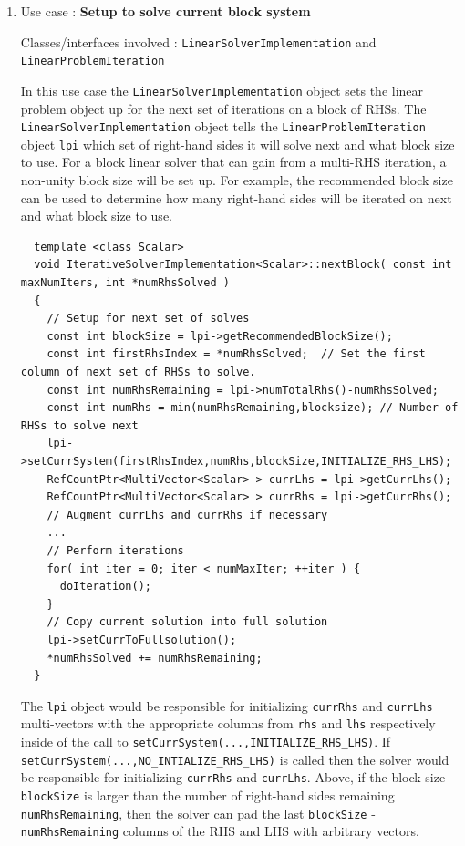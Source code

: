 \documentclass[pdf,ps2pdf,11pt]{SANDreport}
\begin{document}
\begin{enumerate}

{}\item Use case : \textbf{Setup to solve current block system}

{}\noindent{}Classes/interfaces involved :
{}\texttt{Linear\-Solver\-Implementation} and
{}\texttt{Linear\-Problem\-Iteration}

In this use case the {}\texttt{Linear\-Solver\-Implementation} object
sets the linear problem object up for the next set of iterations on a
block of RHSs.  The {}\texttt{Linear\-Solver\-Implementation} object
tells the {}\texttt{Linear\-Problem\-Iteration} object {}\texttt{lpi}
which set of right-hand sides it will solve next and what block size
to use.  For a block linear solver that can gain from a multi-RHS
iteration, a non-unity block size will be set up.  For example, the
recommended block size can be used to determine how many right-hand
sides will be iterated on next and what block size to use.

{\scriptsize\begin{verbatim}
  template <class Scalar>
  void IterativeSolverImplementation<Scalar>::nextBlock( const int maxNumIters, int *numRhsSolved )
  {
    // Setup for next set of solves
    const int blockSize = lpi->getRecommendedBlockSize();
    const int firstRhsIndex = *numRhsSolved;  // Set the first column of next set of RHSs to solve.
    const int numRhsRemaining = lpi->numTotalRhs()-numRhsSolved;
    const int numRhs = min(numRhsRemaining,blocksize); // Number of RHSs to solve next
    lpi->setCurrSystem(firstRhsIndex,numRhs,blockSize,INITIALIZE_RHS_LHS);
    RefCountPtr<MultiVector<Scalar> > currLhs = lpi->getCurrLhs();
    RefCountPtr<MultiVector<Scalar> > currRhs = lpi->getCurrRhs();
    // Augment currLhs and currRhs if necessary
    ...
    // Perform iterations
    for( int iter = 0; iter < numMaxIter; ++iter ) {
      doIteration();
    }
    // Copy current solution into full solution
    lpi->setCurrToFullsolution();
    *numRhsSolved += numRhsRemaining;
  }
\end{verbatim}}

{}\noindent{}The {}\texttt{lpi} object would be responsible for
initializing {}\texttt{currRhs} and {}\texttt{currLhs} multi-vectors
with the appropriate columns from {}\texttt{rhs} and {}\texttt{lhs}
respectively inside of the call to
{}\texttt{set\-Curr\-System(...,\-INITIALIZE\_\-RHS\_\-LHS)}.  If
{}\texttt{set\-Curr\-System(...,\-NO\_\-INTIALIZE\_\-RHS\_\-LHS)} is
called then the solver would be responsible for initializing
{}\texttt{currRhs} and {}\texttt{currLhs}.  Above, if the block size
{}\texttt{blockSize} is larger than the number of right-hand sides
remaining {}\texttt{num\-Rhs\-Remaining}, then the solver can pad the
last {}\texttt{blockSize} - {}\texttt{num\-Rhs\-Remaining} columns of
the RHS and LHS with arbitrary vectors.


\end{enumerate}
\end{document}
